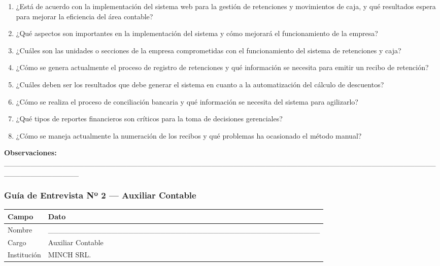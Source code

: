 \documentclass[stu]{apa7}
\begin{document}
\begin{enumerate}
    \item ¿Está de acuerdo con la implementación del sistema web para la gestión de retenciones y movimientos de caja, y qué resultados espera para mejorar la eficiencia del área contable?

    \item ¿Qué aspectos son importantes en la implementación del sistema y cómo mejorará el funcionamiento de la empresa?

    \item ¿Cuáles son las unidades o secciones de la empresa comprometidas con el funcionamiento del sistema de retenciones y caja?

    \item ¿Cómo se genera actualmente el proceso de registro de retenciones y qué información se necesita para emitir un recibo de retención?

    \item ¿Cuáles deben ser los resultados que debe generar el sistema en cuanto a la automatización del cálculo de descuentos?

    \item ¿Cómo se realiza el proceso de conciliación bancaria y qué información se necesita del sistema para agilizarlo?

    \item ¿Qué tipos de reportes financieros son críticos para la toma de decisiones gerenciales?

    \item ¿Cómo se maneja actualmente la numeración de los recibos y qué problemas ha ocasionado el método manual?
\end{enumerate}

\vspace{0.3cm}

\textbf{Observaciones:} \_\_\_\_\_\_\_\_\_\_\_\_\_\_\_\_\_\_\_\_\_\_\_\_\_\_\_\_\_\_\_\_\_\_\_\_\_\_\_\_\_\_\_\_\_\_\_\_\_\_\_\_\_\_\_\_\_\_\_\_\_\_\_\_\_\_\_\_\_\_\_\_\_\_\_\_\_\_\_\_\_\_\_\_\_\_\_\_\_\_\_\_\_\_\_

\newpage

\subsubsection{Guía de Entrevista Nº 2 --- Auxiliar Contable}

\begin{tabularx}{\textwidth}{|l|X|}
\hline
\rowcolor[gray]{0.9}
\textbf{Campo} & \textbf{Dato} \\
\hline
Nombre & \_\_\_\_\_\_\_\_\_\_\_\_\_\_\_\_\_\_\_\_\_\_\_\_\_\_\_\_\_\_\_\_\_\_\_\_\_\_\_\_\_\_\_\_\_\_\_\_\_\_\_ \\
\hline
Cargo & Auxiliar Contable \\
\hline
Institución & MINCH SRL. \\
\hline
\end{tabularx}
\end{document}
